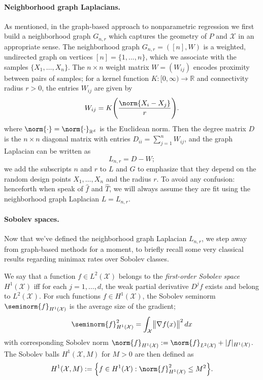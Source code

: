 \documentclass[twoside]{article}
\newcommand{\Reals}{\mathbb{R}}
\newcommand{\1}{\mathbf{1}}
\newcommand{\Rd}{\Reals^d}
\newcommand{\Lap}{L}
\newcommand{\Xset}{\mathcal{X}}
\newcommand{\Leb}{L}
\newcommand{\mc}[1]{\mathcal{#1}}
\newcommand{\wh}[1]{\widehat{#1}}
\theoremstyle{definition}
\theoremstyle{remark}
\begin{document}
\paragraph{Neighborhood graph Laplacians.}
As mentioned, in the graph-based approach to nonparametric regression we first build a neighborhood graph $G_{n,r}$ which captures the geometry of $P$ and $\mc{X}$ in an appropriate sense. The neighborhood graph $G_{n,r} = ([n],W)$ is a weighted, undirected graph on vertices $[n] = \{1,...,n\}$, which we associate with the samples $\{X_1,\ldots,X_n\}$. The $n \times n$ weight matrix $W = (W_{ij})$ encodes proximity between pairs of samples; for a kernel function $K: [0,\infty) \to \Reals$ and connectivity radius $r > 0$, the entries $W_{ij}$ are given by
\begin{equation*}
\label{eqn:neighborhood_graph}
W_{ij} = K\Biggl(\frac{\norm{X_i - X_j}}{r}\Biggr).
\end{equation*}
where $\norm{\cdot} = \norm{\cdot}_{\Rd}$ is the Euclidean norm. Then the degree matrix $D$ is the $n \times n$ diagonal matrix with entries $D_{ii} = \sum_{j = 1}^{n}W_{ij}$, and the graph Laplacian can be written as
\begin{equation}
\label{eqn:graph_Laplacian}
\Lap_{n,r} = D - W;
\end{equation}
we add the subscripts $n$ and $r$ to $\Lap$ and $G$ to emphasize that they depend on the random design points $X_1,\ldots,X_n$ and the radius $r$. To avoid any confusion: henceforth when speak of $\wh{f}$ and $\wh{T}$, we will always assume they are fit using the neighborhood graph Laplacian $L = L_{n,r}$. 

\paragraph{Sobolev spaces.}
Now that we've defined the neighborhood graph Laplacian $\Lap_{n,r}$, we step away from graph-based methods for a moment, to briefly recall some very classical results regarding minimax rates over Sobolev classes.

We say that a function $f \in \Leb^2(\Xset)$ belongs to the \emph{first-order Sobolev space} $H^1(\Xset)$ iff for each $j = 1,\ldots,d$, the weak partial derivative $D^jf$ exists and belong to $\Leb^2(\Xset)$. For such functions $f \in H^1(\Xset)$, the Sobolev seminorm $\seminorm{f}_{H^{1}(\Xset)}$ is the average size of the gradient;
\begin{equation*}
\seminorm{f}_{H^1(\Xset)}^2 = \int_{\Xset} \bigl\|\nabla f(x)\bigr\|^2 \,dx
\end{equation*}
with corresponding Sobolev norm $\norm{f}_{H^1(\Xset)} := \norm{f}_{\Leb^2(\Xset)} + |f|_{H^1(\Xset)}$. The Sobolev balls $H^1(\Xset,M)$ for $M > 0$ are then defined as
\begin{equation*}
H^1(\Xset,M) := \Bigl\{f \in H^1(\Xset): \norm{f}_{H^1(\Xset)}^2 \leq M^2\Bigr\}.
\end{equation*}
\end{document}
